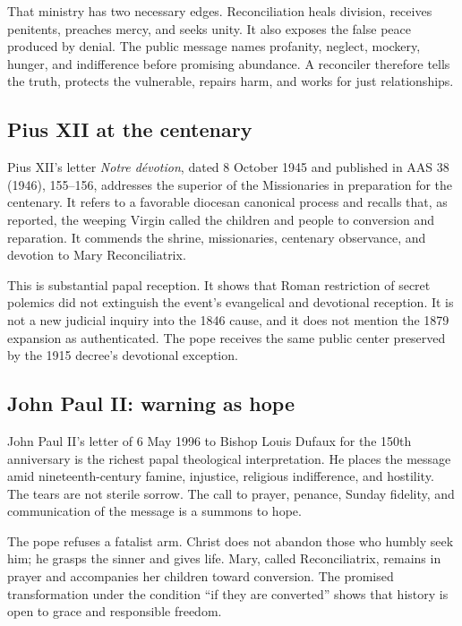 That ministry has two necessary edges. Reconciliation heals division, receives penitents, preaches mercy, and seeks unity. It also exposes the false peace produced by denial. The public message names profanity, neglect, mockery, hunger, and indifference before promising abundance. A reconciler therefore tells the truth, protects the vulnerable, repairs harm, and works for just relationships.

\subsection{Pius XII at the centenary}

Pius XII's letter \emph{Notre dévotion}, dated 8 October 1945 and published in AAS 38 (1946), 155--156, addresses the superior of the Missionaries in preparation for the centenary. It refers to a favorable diocesan canonical process and recalls that, as reported, the weeping Virgin called the children and people to conversion and reparation. It commends the shrine, missionaries, centenary observance, and devotion to Mary Reconciliatrix.

This is substantial papal reception. It shows that Roman restriction of secret polemics did not extinguish the event's evangelical and devotional reception. It is not a new judicial inquiry into the 1846 cause, and it does not mention the 1879 expansion as authenticated. The pope receives the same public center preserved by the 1915 decree's devotional exception.

\subsection{John Paul II: warning as hope}

John Paul II's letter of 6 May 1996 to Bishop Louis Dufaux for the 150th anniversary is the richest papal theological interpretation. He places the message amid nineteenth-century famine, injustice, religious indifference, and hostility. The tears are not sterile sorrow. The call to prayer, penance, Sunday fidelity, and communication of the message is a summons to hope.

The pope refuses a fatalist arm. Christ does not abandon those who humbly seek him; he grasps the sinner and gives life. Mary, called Reconciliatrix, remains in prayer and accompanies her children toward conversion. The promised transformation under the condition ``if they are converted'' shows that history is open to grace and responsible freedom.

